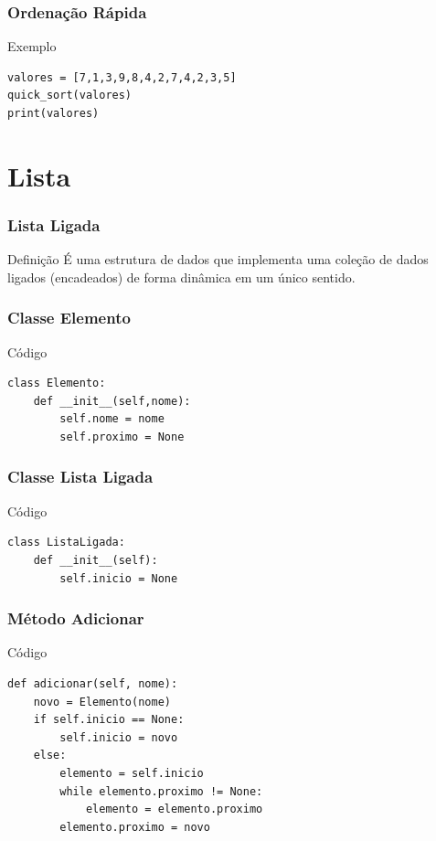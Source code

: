 \documentclass{beamer}
\begin{document}
\begin{frame}[fragile]
\frametitle{Ordenação Rápida}

\begin{exampleblock}{Exemplo}
	\begin{lstlisting}
valores = [7,1,3,9,8,4,2,7,4,2,3,5]
quick_sort(valores)
print(valores)
	\end{lstlisting}
\end{exampleblock}
\end{frame}

\section{Lista}

\begin{frame}
\frametitle{Lista Ligada}

\begin{block}{Definição}
	É uma estrutura de dados que implementa uma coleção de dados ligados (encadeados) de forma dinâmica em um único sentido.
\end{block}
\end{frame}

\begin{frame}[fragile]
\frametitle{Classe Elemento}

\begin{exampleblock}{Código}
	\begin{lstlisting}
class Elemento:
    def __init__(self,nome):
        self.nome = nome
        self.proximo = None
	\end{lstlisting}
\end{exampleblock}
\end{frame}

\begin{frame}[fragile]
\frametitle{Classe Lista Ligada}

\begin{exampleblock}{Código}
	\begin{lstlisting}
class ListaLigada:
    def __init__(self):
        self.inicio = None
	\end{lstlisting}
\end{exampleblock}
\end{frame}

\begin{frame}[fragile]
\frametitle{Método Adicionar}

\begin{exampleblock}{Código}
	\begin{lstlisting}
def adicionar(self, nome):
    novo = Elemento(nome)
    if self.inicio == None:
        self.inicio = novo
    else:
        elemento = self.inicio
        while elemento.proximo != None:
            elemento = elemento.proximo
        elemento.proximo = novo
	\end{lstlisting}
\end{exampleblock}
\end{frame}
\end{document}
